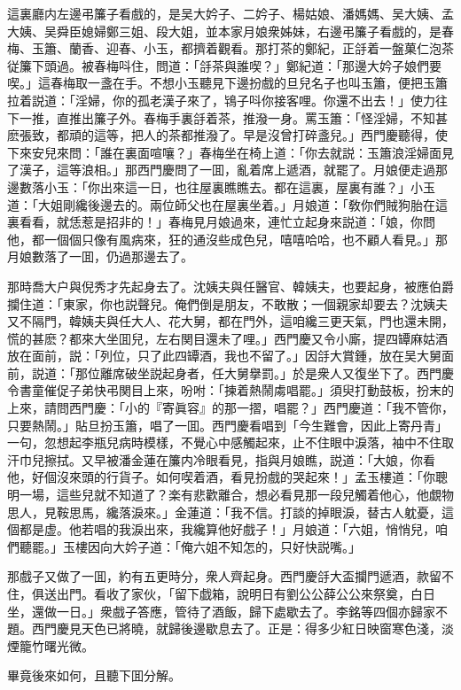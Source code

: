 這裏廳内左邊弔簾子看戲的，是吴大妗子、二妗子、楊姑娘、潘媽媽、吴大姨、孟大姨、吴舜臣媳婦鄭三姐、段大姐，並本家月娘衆姊妹，右邊弔簾子看戲的，是春梅、玉簫、蘭香、迎春、小玉，都擠着觀看。那打茶的鄭紀，正㧱着一盤菓仁泡茶従簾下頭過。被春梅呌住，問道：「㧱茶與誰喫？」鄭紀道：「那邊大妗子娘們要喫。」這春梅取一盞在手。不想小玉聽見下邊扮戲的旦兒名子也叫玉簫，便把玉簫拉着説道：「淫婦，你的孤老漢子來了，鴇子呌你接客哩。你還不出去！」使力往下一推，直推出簾子外。春梅手裏㧱着茶，推潑一身。罵玉簫：「怪淫婦，不知甚麽張致，都頑的這等，把人的茶都推潑了。早是沒曾打碎盞兒。」西門慶聽得，使下來安兒來問：「誰在裏面喧嚷？」春梅坐在椅上道：「你去就説：玉簫浪淫婦面見了漢子，這等浪相。」那西門慶問了一囬，亂着席上遞酒，就罷了。月娘便走過那邊數落小玉：「你出來這一日，也往屋裏瞧瞧去。都在這裏，屋裏有誰？」小玉道：「大姐剛纔後邊去的。兩位師父也在屋裏坐着。」月娘道：「敎你們賊狗胎在這裏看看，就恁惹是招非的！」春梅見月娘過來，連忙立起身來説道：「娘，你問他，都一個個只像有風病來，狂的通沒些成色兒，嘻嘻哈哈，也不顧人看見。」那月娘數落了一囬，仍過那邊去了。

那時喬大户與倪秀才先起身去了。沈姨夫與任醫官、韓姨夫，也要起身，被應伯爵攔住道：「東家，你也説聲兒。俺們倒是朋友，不敢散；一個親家却要去？沈姨夫又不隔門，韓姨夫與任大人、花大舅，都在門外，這咱纔三更天氣，門也還未開，慌的甚麽？都來大坐囬兒，左右関目還未了哩。」西門慶又令小廝，提四罈麻姑酒放在面前，説：「列位，只了此四罈酒，我也不留了。」因㧱大賞鍾，放在吴大舅面前，説道：「那位離席破坐説起身者，任大舅擧罰。」於是衆人又復坐下了。西門慶令書童催促子弟快弔関目上來，吩咐：「揀着熱鬧䖏唱罷。」須臾打動鼓板，扮末的上來，請問西門慶：「小的『寄眞容』的那一摺，唱罷？」西門慶道：「我不管你，只要熱鬧。」貼旦扮玉簫，唱了一囬。西門慶看唱到「今生難會，因此上寄丹青」一句，忽想起李瓶兒病時模樣，不覺心中感觸起來，止不住眼中淚落，袖中不住取汗巾兒擦拭。又早被潘金蓮在簾内冷眼看見，指與月娘瞧，説道：「大娘，你看他，好個沒來頭的行貨子。如何喫着酒，看見扮戲的哭起來！」孟玉樓道：「你聰明一場，這些兒就不知道了？楽有悲歡離合，想必看見那一段兒觸着他心，他覷物思人，見鞍思馬，纔落淚來。」金蓮道：「我不信。打談的掉眼淚，替古人躭憂，這個都是虚。他若唱的我淚出來，我纔算他好戲子！」月娘道：「六姐，悄悄兒，咱們聽罷。」玉樓因向大妗子道：「俺六姐不知怎的，只好快説嘴。」

那戲子又做了一囬，約有五更時分，衆人齊起身。西門慶㧱大盃攔門遞酒，款留不住，俱送出門。看收了家伙，「留下戯箱，說明日有劉公公薛公公來祭奠，白日坐，還做一日。」衆戲子答應，管待了酒飯，歸下處歇去了。李銘等四個亦歸家不題。西門慶見天色已將曉，就歸後邊歇息去了。正是：得多少紅日映窗寒色淺，淡煙籠竹曙光微。

畢竟後來如何，且聽下囬分解。

